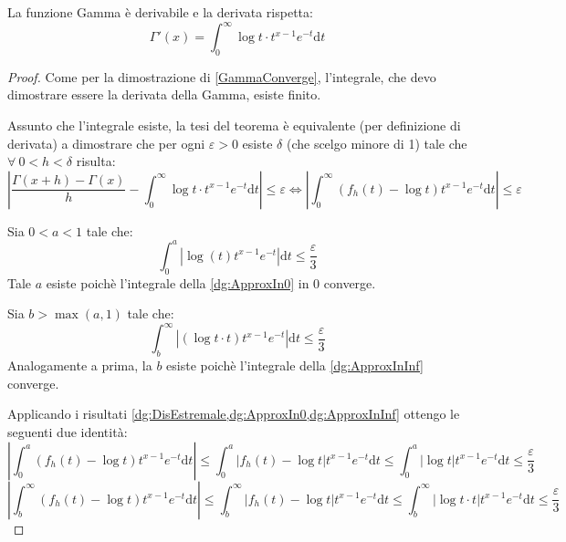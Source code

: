 \begin{theorem}\label{dg:GammaDerivata}
	La funzione Gamma è derivabile e la derivata rispetta:
	\begin{equation*}
		\Gamma'(x)=\int_0^{\infty} \log{t}\cdot t^{x-1}e^{-t}\mathrm{d}t
	\end{equation*}
\end{theorem}
\begin{proof}
	Come per la dimostrazione di \cref{GammaConverge}, l'integrale, che devo dimostrare
	essere la derivata della Gamma, esiste finito.
	
	Assunto che l'integrale esiste, la tesi del teorema è equivalente (per definizione di derivata) a dimostrare
	che per ogni $\varepsilon>0$ esiste $\delta$ (che scelgo minore di 1) tale che $\forall\ 0<h<\delta$ risulta:
	\begin{equation}\label{dg:EpsDeltaDerivata}
		\left\lvert 
		\frac{\Gamma(x+h)-\Gamma(x)}{h}-
		\int_0^{\infty} \log{t}\cdot t^{x-1}e^{-t}\mathrm{d}t
		\right\rvert \le \varepsilon
		\Longleftrightarrow
		\left\lvert
		\int_0^{\infty} \left(f_h(t)-\log{t}\right)t^{x-1}e^{-t}\mathrm{d}t
		\right\rvert \le \varepsilon
	\end{equation}
	
	Sia $0<a<1$ tale che:
	\begin{equation}\label{dg:ApproxIn0}
		\int_0^a \left\lvert \log(t)t^{x-1}e^{-t} \right\rvert \mathrm{d}t \le \frac{\varepsilon}3
	\end{equation}
	Tale $a$ esiste poichè l'integrale della \cref{dg:ApproxIn0} in 0 converge.
	
	Sia $b>\max(a,1)$ tale che:
	\begin{equation}\label{dg:ApproxInInf}
		\int_b^{\infty} \left\lvert (\log{t}\cdot t)t^{x-1}e^{-t}\right\rvert \mathrm{d}t \le \frac{\varepsilon}3
	\end{equation}
	Analogamente a prima, la $b$ esiste poichè l'integrale della \cref{dg:ApproxInInf} converge.
	
	Applicando i risultati \cref{dg:DisEstremale,dg:ApproxIn0,dg:ApproxInInf} ottengo le seguenti due identità:
	\begin{equation}\label{dg:IntIn0}
		\left\lvert \int_0^a \left(f_h(t)-\log{t}\right)t^{x-1}e^{-t}\mathrm{d}t\right\rvert
		\le
		\int_0^a \left\lvert f_h(t)-\log{t} \right\rvert t^{x-1}e^{-t}\mathrm{d}t
		\le
		\int_0^a \left\lvert \log{t} \right\rvert t^{x-1}e^{-t}\mathrm{d}t
		\le
		\frac{\varepsilon}3
	\end{equation}
	\begin{equation}\label{dg:IntInInf}
		\left\lvert \int_b^{\infty} \left(f_h(t)-\log{t}\right)t^{x-1}e^{-t}\mathrm{d}t\right\rvert
		\le
		\int_b^{\infty} \left\lvert f_h(t)-\log{t} \right\rvert t^{x-1}e^{-t}\mathrm{d}t
		\le
		\int_b^{\infty} \left\lvert \log{t}\cdot t\right\rvert t^{x-1}e^{-t}\mathrm{d}t
		\le
		\frac{\varepsilon}3
	\end{equation}
	

\end{proof}
